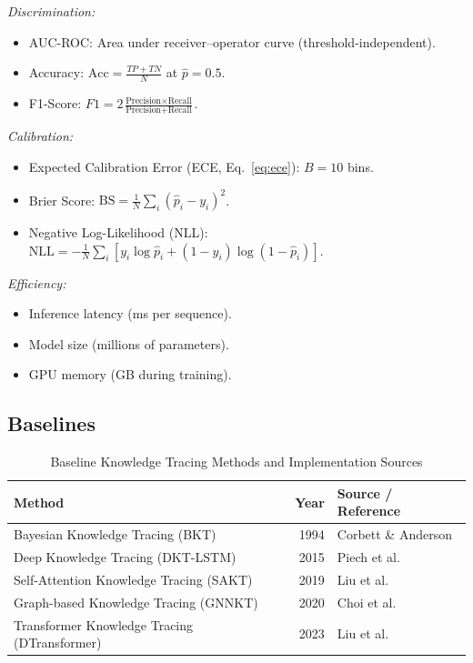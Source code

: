 \documentclass[preprint,12pt]{elsarticle}
\begin{document}
\textit{Discrimination:}
\begin{itemize}
\item AUC-ROC: Area under receiver--operator curve (threshold-independent).
\item Accuracy: $\text{Acc} = \frac{TP + TN}{N}$ at $\hat{p} = 0.5$.
\item F1-Score: $F1 = 2\frac{\text{Precision} \times \text{Recall}}{\text{Precision} + \text{Recall}}$.
\end{itemize}

\textit{Calibration:}
\begin{itemize}
\item Expected Calibration Error (ECE, Eq.~\ref{eq:ece}): $B=10$ bins.
\item Brier Score: $\text{BS} = \frac{1}{N}\sum_i (\hat{p}_i - y_i)^2$.
\item Negative Log-Likelihood (NLL): $\text{NLL} = -\frac{1}{N}\sum_i [y_i\log\hat{p}_i + (1-y_i)\log(1-\hat{p}_i)]$.
\end{itemize}

\textit{Efficiency:}
\begin{itemize}
\item Inference latency (ms per sequence).
\item Model size (millions of parameters).
\item GPU memory (GB during training).
\end{itemize}

\subsection{Baselines}

\begin{table}[H]\centering
\caption{Baseline Knowledge Tracing Methods and Implementation Sources}\label{tab:baselines}
\small
\begin{tabularx}{\linewidth}{@{\extracolsep{\fill}}lrX@{}}\toprule
\textbf{Method} & \textbf{Year} & \textbf{Source / Reference}\\\midrule
Bayesian Knowledge Tracing (BKT) & 1994 & Corbett \& Anderson \cite{corbett1994}\\
Deep Knowledge Tracing (DKT-LSTM) & 2015 & Piech et al. \cite{piech2015}\\
Self-Attention Knowledge Tracing (SAKT) & 2019 & Liu et al. \cite{Liu2023Self}\\
Graph-based Knowledge Tracing (GNNKT) & 2020 & Choi et al. \cite{Choi2020Towards}\\
Transformer Knowledge Tracing (DTransformer) & 2023 & Liu et al. \cite{Liu2023Self}\\
\bottomrule\end{tabularx}
\end{table}
\end{document}

